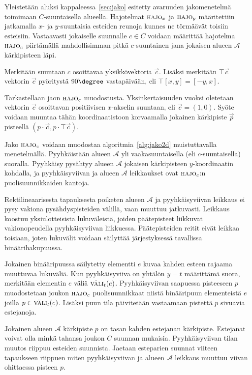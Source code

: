 \documentclass[finnish]{tktltiki2}
\theoremstyle{definition}
\theoremstyle{remark}
\newcommand\fspace{\ensuremath{\mathcal{A}}\xspace}
\newcommand\decomp[1]{\ensuremath{\textsc{hajo}_{#1}}\xspace}
\newcommand\rotr[1]{\ensuremath{\top #1}\xspace}
\newcommand\vecof[1]{\ensuremath{\left [#1\right ]}\xspace}
\newcommand\intert[2]{\ensuremath{\textsc{väli}_{#1}(#2)}\xspace}
\newcommand\point[1]{\ensuremath{\left ({#1}\right )}\xspace}
\begin{document}
Yleistetään aluksi kappaleessa~\ref{sec:jako} esitetty avaruuden jakomenetelmä toimimaan $C$-suuntaisella alueella.
Hajotelmat \decomp{x} ja \decomp{y} määritettiin jatkamalla $x$- ja $y$-suuntaisia esteiden reunoja kunnes ne törmäävät toisiin esteisiin.
Vastaavasti jokaiselle suunnalle $c\in C$ voidaan määrittää hajotelma \decomp{c} piirtämällä mahdollisimman pitkä $c$-suuntainen jana jokaisen alueen \fspace kärkipisteen läpi.

Merkitään suuntaan $c$ osoittavaa yksikkövektoria $\vec{c}$.
Lisäksi merkitään \rotr{\vec{c}} vektorin $\vec{c}$ pyöritystä $90\degree$ vastapäivään, eli $\rotr{\vecof{x,y}}=\vecof{-y,x}$.

Tarkastellaan jaon \decomp{c} muodostusta.
Yksinkertaisuuden vuoksi oletetaan vektorin $\vec{c}$ osoittavan positiivisen $x$-akselin suuntaan, eli $\vec{c}=\point{1,0}$.
Syöte voidaan muuntaa tähän koordinaatistoon korvaamalla jokainen kärkipiste $\vec{p}$ pisteellä $\point{p\cdot\vec{c},p\cdot\rotr{\vec{c}}}$.

Jako \decomp{c} voidaan muodostaa algoritmia~\ref{alg:jako2d} muistuttavalla menetelmällä.
Pyyhkäistään alueen \fspace yli vaakasuuntaisella (eli $c$-suuntaisella) suoralla.
Pyyhkäisy pysähtyy alueen \fspace jokaisen kärkipisteen $y$-koordinaatin kohdalla, ja pyyhkäisyviivan ja alueen \fspace leikkaukset ovat \decomp{c}:n puolisuunnikkaiden kantoja.

Rektilineaarisesta tapauksesta poiketen alueen \fspace ja pyyhkäisyviivan leikkaus ei pysy vakiona pysähdyspisteiden välillä, vaan muuttuu jatkuvasti.
Leikkaus koostuu yksiulotteisista lukuväleistä, joiden päätepisteet liikkuvat vakionopeudella pyyhkäisyviivan liikkuessa.
Päätepisteiden reitit eivät leikkaa toisiaan, joten lukuvälit voidaan säilyttää järjestyksessä tavallissa binäärihakupuussa.

Jokainen binääripuussa säilytetty elementti $e$ kuvaa kahden esteen rajaama muuttuvaa lukuväliä.
Kun pyyhkäisyviiva on yhtälön $y=t$ määrittämä suora, merkitään elementin $e$ väliä \intert{t}{e}.
Pyyhkäisyviivan saapuessa pisteeseen $p$ muodostetaan joukon \decomp{c} puolisuunnikkaat niistä binääripuun elementeistä $e$ joilla $p\in\intert{t}{e}$.
Lisäksi puun tila päivitetään vastaamaan pistettä $p$ sivuavia estejanoja.

Jokainen alueen \fspace kärkipiste $p$ on tasan kahden estejanan kärkipiste.
Estejanat voivat olla minkä tahansa joukon $C$ suunnan mukaisia.
Pyyhkäisyviivan tilan muutos riippuu esteiden suunnista.
Jaetaan esteparien suunnat viiteen tapaukseen riippuen miten pyyhkäisyviivan ja alueen \fspace leikkaus muuttuu viivan ohittaessa pisteen $p$.
\end{document}

